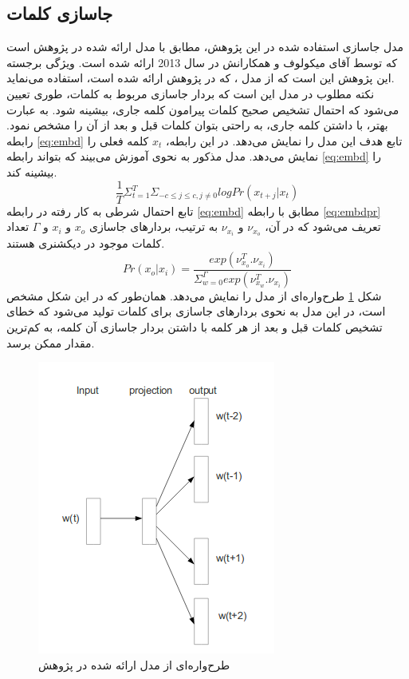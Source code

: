 \subsection{جاسازی کلمات}
مدل جاسازی استفاده شده در این پژوهش، مطابق با مدل ارائه شده در پژوهش \cite{mikolov2013distributed} است که توسط آقای میکولوف و همکارانش در سال 2013 ارائه شده است. ویژگی برجسته این پژوهش این است که از مدل ، که در پژوهش \cite{mikolov2013efficient} ارائه شده است، استفاده می‌نماید.
\\
نکته مطلوب در مدل  این است که بردار جاسازی مربوط به کلمات، طوری تعیین می‌شود که احتمال تشخیص صحیح کلمات پیرامون کلمه جاری، بیشینه شود. به عبارت بهتر، با داشتن کلمه جاری، به راحتی بتوان کلمات قبل و بعد از آن را مشخص نمود. رابطه \eqref{eq:embd} تابع هدف این مدل را نمایش می‌دهد. در این رابطه،‌ $x_t$ کلمه فعلی را نمایش می‌دهد. مدل مذکور به نحوی آموزش می‌بیند که بتواند رابطه \eqref{eq:embd} را بیشینه کند.
\begin{equation}
	\frac{1}{T} \Sigma_{t=1}^T \Sigma_{-c \le j \le c, j \ne 0} log Pr(x_{t+j} | x_t)
	\label{eq:embd}
\end{equation}
تابع احتمال شرطی به کار رفته در رابطه \eqref{eq:embd} مطابق با رابطه \eqref{eq:embdpr} تعریف می‌شود که در آن، $\nu_{x_o}$ و $\nu_{x_i}$ به ترتیب، بردارهای جاسازی $x_o$ و $x_i$‌ و $\Gamma$ تعداد کلمات موجود در دیکشنری هستند.
\begin{equation}
	Pr(x_o | x_i) = \frac{exp(\nu^T_{x_o} . \nu_{x_i})}{\Sigma_{w=0}^\Gamma exp(\nu^T_{x_w} . \nu_{x_i})}
	\label{eq:embdpr}
\end{equation}
شکل \ref{fig:embd} طرح‌واره‌ای از مدل  را نمایش می‌دهد. همان‌طور که در این شکل مشخص است، در این مدل به نحوی بردارهای جاسازی برای کلمات تولید می‌شود که خطای تشخیص کلمات قبل و بعد از هر کلمه با داشتن بردار جاسازی آن کلمه، به کم‌ترین مقدار ممکن برسد.

\begin{figure}[h]
	\centering
	\includegraphics[scale=0.5]{Imgs/skipgram.png}
	\caption[طرح‌واره‌ای از مدل ]{طرح‌واره‌ای از مدل  ارائه شده در پژوهش \cite{mikolov2013distributed}}
	\label{fig:embd}
\end{figure}

